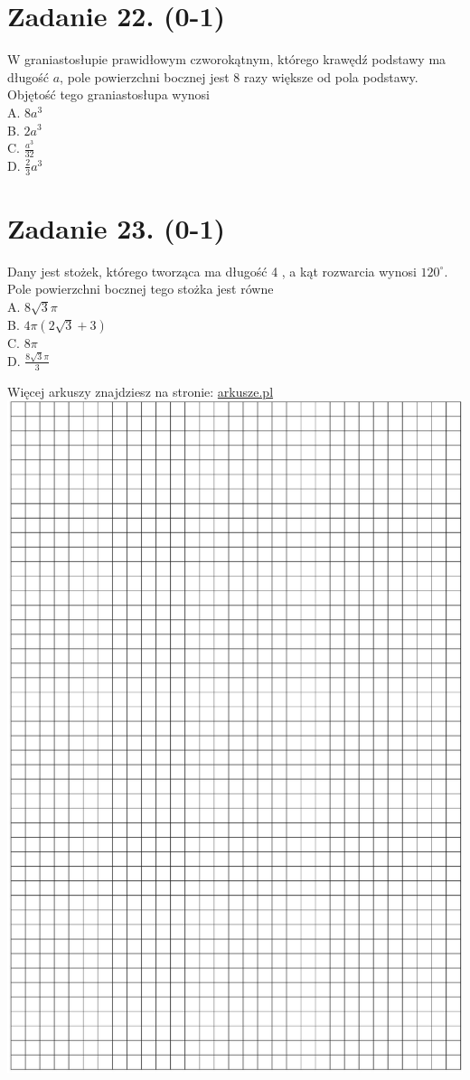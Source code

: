 \documentclass[10pt]{article}
\begin{document}
\section*{Zadanie 22. (0-1)}
W graniastosłupie prawidłowym czworokątnym, którego krawędź podstawy ma długość \(a\), pole powierzchni bocznej jest 8 razy większe od pola podstawy. Objętość tego graniastosłupa wynosi\\
A. \(8 a^{3}\)\\
B. \(2 a^{3}\)\\
C. \(\frac{a^{3}}{32}\)\\
D. \(\frac{2}{3} a^{3}\)

\section*{Zadanie 23. (0-1)}
Dany jest stożek, którego tworząca ma długość 4 , a kąt rozwarcia wynosi \(120^{\circ}\). Pole powierzchni bocznej tego stożka jest równe\\
A. \(8 \sqrt{3} \pi\)\\
B. \(4 \pi(2 \sqrt{3}+3)\)\\
C. \(8 \pi\)\\
D. \(\frac{8 \sqrt{3} \pi}{3}\)

Więcej arkuszy znajdziesz na stronie: \href{http://arkusze.pl}{arkusze.pl}\\
\includegraphics[max width=\textwidth, center]{2024_11_21_4a1915d79134dda0750eg-09}
\end{document}
